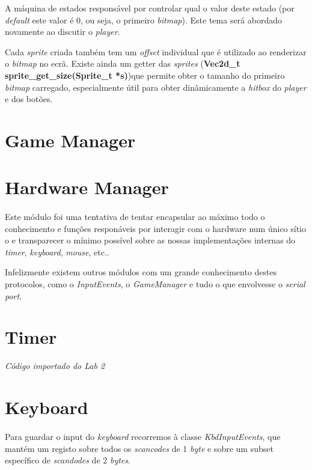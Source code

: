 \documentclass{report}
\begin{document}
A máquina de estados responsável por controlar qual o valor deste estado (por \textit{default} este valor é 0, ou seja, o primeiro \textit{bitmap}). Este tema será abordado novamente ao discutir o \textit{player}.

Cada \textit{sprite} criada também tem um \textit{offset} individual que é utilizado ao renderizar o \textit{bitmap} no ecrã. Existe ainda um getter das \textit{sprites} (\textbf{Vec2d\_t sprite\_get\_size(Sprite\_t *s)})que permite obter o tamanho do primeiro \textit{bitmap} carregado, especialmente útil para obter dinâmicamente a \textit{hitbox} do \textit{player} e dos botões. 

\section{Game Manager}

\section{Hardware Manager}

\paragraph{}
Este módulo foi uma tentativa de tentar encapsular ao máximo todo o conhecimento e funções responáveis por interagir com o hardware num único sítio o e transparecer o mínimo possível sobre as nossas implementações internas do \textit{timer}, \textit{keyboard}, \textit{mouse}, etc..

Infelizmente existem outros módulos com um grande conhecimento destes protocolos, como o \textit{InputEvents}, o \textit{GameManager} e tudo o que envolvesse o \textit{serial port}.

\section{Timer}

\textit{Código importado do Lab 2}\footnotemark

\section{Keyboard}

\paragraph{}
Para guardar o input do \textit{keyboard} recorremos à classe \textit{KbdInputEvents}, que mantém um registo sobre todos os \textit{scancodes} de 1 \textit{byte} e sobre um subset específico de \textit{scandodes} de 2 \textit{bytes}.
\end{document}
